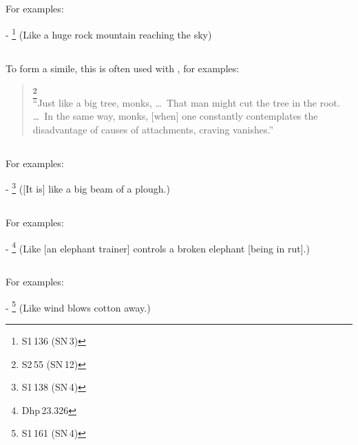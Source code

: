 \subsection*{}\label{nip:yathaapi}
For examples:\par
- \footnote{S1\,136 (SN\,3)} (Like a huge rock mountain reaching the sky) \par

\subsection*{}\label{nip:seyyathaapi}
To form a simile, this is often used with , for examples:\par
\begin{quote}
\footnote{S2\,55 (SN\,12)}\\
``Just like a big tree, monks, \ldots\ That man might cut the tree in the root. \ldots\ In the same way, monks, [when] one constantly contemplates the disadvantage of causes of attachments, craving vanishes.''\\
\end{quote}

\subsection*{}\label{nip:seyyathaapinaama}
For examples:\par
- \footnote{S1\,138 (SN\,4)} ([It is] like a big beam of a plough.) \par

\subsection*{}\label{nip:viya}
For examples:\par
- \footnote{Dhp\,23.326} (Like [an elephant trainer] controls a broken elephant [being in rut].) \par

\subsection*{}\label{nip:iva}
For examples:\par
- \footnote{S1\,161 (SN\,4)} (Like wind blows cotton away.) \par

